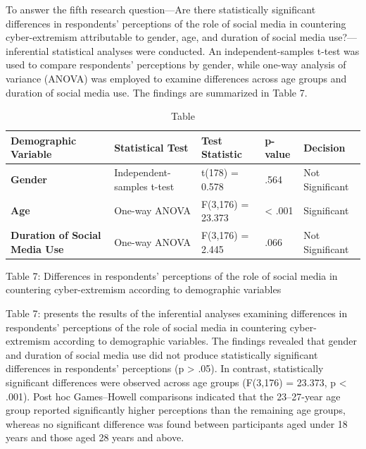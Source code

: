 \documentclass{NSP1}
\begin{document}
\par\medskip{}\smallskip

To answer the fifth research question—Are there statistically significant differences in respondents' perceptions of the role of social media in countering cyber-extremism attributable to gender, age, and duration of social media use?—inferential statistical analyses were conducted. An independent-samples t-test was used to compare respondents' perceptions by gender, while one-way analysis of variance (ANOVA) was employed to examine differences across age groups and duration of social media use. The findings are summarized in Table 7.

\begin{table}[tbp]
\centering
{\small
\begin{tabular}{|>{\centering\arraybackslash}p{}|>{\centering\arraybackslash}p{}|>{\centering\arraybackslash}p{}|p{}|>{\centering\arraybackslash}p{}|}
\hline
\cellcolor[HTML]{DDD9C3}\textbf{Demographic Variable} & \cellcolor[HTML]{DDD9C3}\textbf{Statistical Test} & \cellcolor[HTML]{DDD9C3}\textbf{Test Statistic} & \cellcolor[HTML]{DDD9C3}\textbf{p-value} & \cellcolor[HTML]{DDD9C3}\textbf{Decision} \\
\hline
\cellcolor[HTML]{DDD9C3}\textbf{Gender} & Independent-samples t-test & t(178) = 0.578 & .564 & Not Significant \\
\hline
\cellcolor[HTML]{DDD9C3}\textbf{Age} & One-way ANOVA & F(3,176) = 23.373 & \textless{} .001 & Significant \\
\hline
\cellcolor[HTML]{DDD9C3}\textbf{Duration of Social Media Use} & One-way ANOVA & F(3,176) = 2.445 & .066 & Not Significant \\
\hline
\end{tabular}}
\caption{Table}

\end{table}

Table 7: Differences in respondents' perceptions of the role of social media in countering cyber-extremism according to demographic variables

Table 7: presents the results of the inferential analyses examining differences in respondents' perceptions of the role of social media in countering cyber-extremism according to demographic variables. The findings revealed that gender and duration of social media use did not produce statistically significant differences in respondents' perceptions (p \textgreater{} .05). In contrast, statistically significant differences were observed across age groups (F(3,176) = 23.373, p \textless{} .001). Post hoc Games–Howell comparisons indicated that the 23–27-year age group reported significantly higher perceptions than the remaining age groups, whereas no significant difference was found between participants aged under 18 years and those aged 28 years and above.
\end{document}
